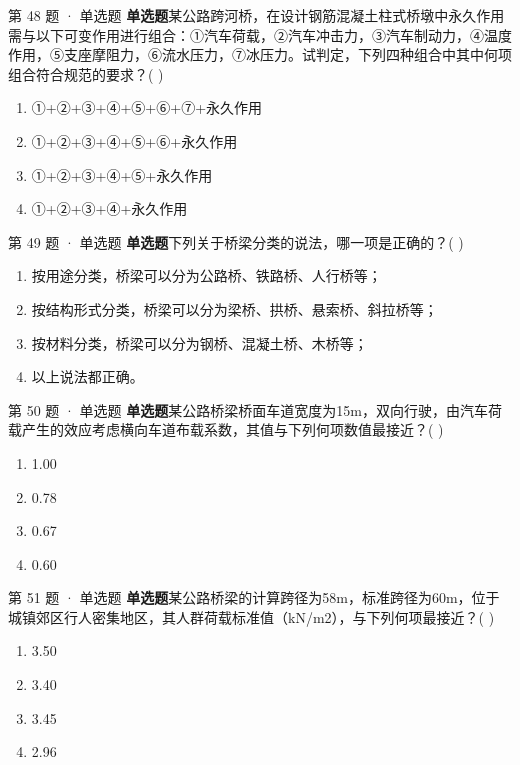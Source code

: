 \documentclass[UTF8,zihao=-4,openany]{ctexbook}
\newenvironment{choices}{\begin{enumerate}[label=\Alph*.,leftmargin=9mm,labelsep=3mm,itemsep=2pt,topsep=4pt]}{\end{enumerate}}
\newcommand{\qtype}[1]{\textcolor{brand}{\sffamily\bfseries #1}}
\begin{document}
\begin{questionbox}{第 48 题 · 单选题}
\qtype{单选题}\quad 某公路跨河桥，在设计钢筋混凝土柱式桥墩中永久作用需与以下可变作用进行组合：①汽车荷载，②汽车冲击力，③汽车制动力，④温度作用，⑤支座摩阻力，⑥流水压力，⑦冰压力。试判定，下列四种组合中其中何项组合符合规范的要求？( )
\begin{choices}
\item ①+②+③+④+⑤+⑥+⑦+永久作用
\item ①+②+③+④+⑤+⑥+永久作用
\item ①+②+③+④+⑤+永久作用
\item ①+②+③+④+永久作用
\end{choices}
\end{questionbox}

\begin{questionbox}{第 49 题 · 单选题}
\qtype{单选题}\quad 下列关于桥梁分类的说法，哪一项是正确的？( )
\begin{choices}
\item 按用途分类，桥梁可以分为公路桥、铁路桥、人行桥等；
\item 按结构形式分类，桥梁可以分为梁桥、拱桥、悬索桥、斜拉桥等；
\item 按材料分类，桥梁可以分为钢桥、混凝土桥、木桥等；
\item 以上说法都正确。
\end{choices}
\end{questionbox}

\begin{questionbox}{第 50 题 · 单选题}
\qtype{单选题}\quad 某公路桥梁桥面车道宽度为15m，双向行驶，由汽车荷载产生的效应考虑横向车道布载系数，其值与下列何项数值最接近？( )
\begin{choices}
\item 1.00
\item 0.78
\item 0.67
\item 0.60
\end{choices}
\end{questionbox}

\begin{questionbox}{第 51 题 · 单选题}
\qtype{单选题}\quad 某公路桥梁的计算跨径为58m，标准跨径为60m，位于城镇郊区行人密集地区，其人群荷载标准值（kN/m2），与下列何项最接近？( )
\begin{choices}
\item 3.50
\item 3.40
\item 3.45
\item 2.96
\end{choices}
\end{questionbox}
\end{document}

